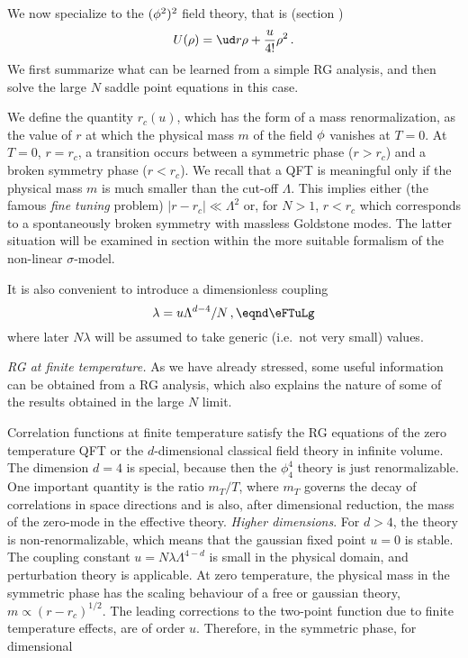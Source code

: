 We now specialize to the $(\phi^2)^2$ field theory,
that is (section \ssfivNi) \sslbl\ssNTfiv
$$U(\rho )=\ud r \rho +{ u\over 4!}\rho^2\,.$$
We first summarize what can be learned from a simple RG analysis,
and then solve the large $N$ saddle point equations in this case. \par
We define the quantity $r_c(u)$, which has the form of a mass renormalization, as the value of $r$ at which the physical
mass $m$ of the field $\phi$
vanishes at $T=0$. At $T=0$, $r=r_c$, a  transition occurs between a symmetric phase ($r>r_c$) and
a broken symmetry phase ($r<r_c$). We recall that a QFT is meaningful only if
the physical mass $m$ is much smaller than the cut-off $\Lambda$. This implies
either (the famous {\it fine tuning}\/ problem) $|r-r_c| \ll \Lambda^2  $
or, for $N> 1$,  $r<r_c$ which corresponds to a spontaneously broken symmetry with massless Goldstone modes. The latter situation will be examined in
section \label{\ssFTnls} within the more suitable formalism of the non-linear
$\sigma $-model.  \par
It is also convenient to introduce a dimensionless coupling
$$ \lambda = u \Lambda^{d-4}/N  \,, \eqnd\eFTuLg $$
where later $N\lambda $ will be assumed to take generic (i.e.\ not very small) values. \par
\medskip
{\it RG at finite temperature.}
As we have already stressed, some useful information can be obtained from a RG analysis, which also explains the nature of some of the results
obtained in the large $N$ limit. \par
Correlation functions at finite temperature satisfy the RG equations
of the zero temperature QFT or the $d $-dimensional classical
field theory in infinite volume. The dimension $d=4$ is special, because then
the $\phi^4_4$ theory is just renormalizable.  One important quantity is the ratio $ m_T/T$,
where  $m_T$ governs the decay of correlations in space directions and is also, after dimensional reduction, the mass of the zero-mode in the effective theory.
\smallskip
{\it Higher dimensions}. For $d>4$, the theory is non-renormalizable, which
means that the gaussian fixed point $u=0$ is stable. The coupling constant
$u=N\lambda \Lambda^{4-d}$ is small in the physical domain, and perturbation theory is applicable. At zero temperature, the physical mass in the symmetric phase has the
scaling behaviour of a free or gaussian theory, $m\propto (r-r_c)^{1/2}$.
The leading corrections to the two-point function due to finite temperature
effects, are of order $u$. Therefore, in the symmetric phase, for dimensional
